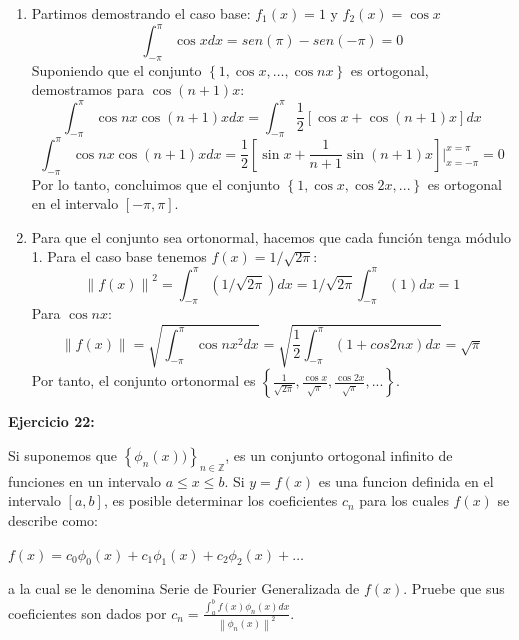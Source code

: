\documentclass[12pt]{article}
\begin{document}
\begin{enumerate}[label=(\alph*)]

    \item Partimos demostrando el caso base: $f_1(x)=1$ y $f_2(x)=\cos{x}$
    \begin{equation}
        \int_{-\pi}^{\pi} \cos{x} dx = sen(\pi)-sen(-\pi)=0
    \end{equation}
    Suponiendo que el conjunto  $\left\lbrace1,\cos{x},\dots,\cos{nx}\right\rbrace$ es ortogonal, demostramos para $\cos{(n+1)x}$:
    \begin{equation}
       \int_{-\pi}^{\pi} \cos{nx}\cos{(n+1)x} dx = \int_{-\pi}^{\pi} \frac{1}{2}\left[ \cos{x}+\cos{(n+1)x} \right] dx
    \end{equation}
    \begin{equation}
       \int_{-\pi}^{\pi} \cos{nx}\cos{(n+1)x} dx  =\frac{1}{2}\left[ \sin{x} + \frac{1}{n+1} \sin{(n+1)x} \right]\bigg\vert_{x=-\pi}^{x=\pi}=0
    \end{equation}
    Por lo tanto, concluimos que el conjunto $\left\lbrace1,\cos{x},\cos{2x},...\right\rbrace$ es ortogonal en el intervalo $[-\pi,\pi]$.

    \item Para que el conjunto sea ortonormal, hacemos que cada función tenga módulo 1. Para el caso base tenemos $f(x)=1/\sqrt{2 \pi }$:
    \begin{equation}
        \left\| f(x) \right\|^2 = \int_{-\pi}^{\pi} (1/\sqrt{2 \pi }) dx = 1/\sqrt{ 2\pi } \int_{-\pi}^{\pi} (1) dx = 1
    \end{equation}
    Para $\cos{nx}$:
    \begin{equation}
        \left\| f(x) \right\| = \sqrt{ \int_{-\pi}^{\pi} \cos{nx}^2 dx } = \sqrt{\frac{1}{2}\int_{-\pi}^{\pi} (1+cos2nx) dx } = \sqrt{\pi}
    \end{equation}
    Por tanto, el conjunto ortonormal es $\left\lbrace\frac{1}{\sqrt{2\pi}},\frac{\cos{x}}{\sqrt{\pi}},\frac{\cos{2x}}{\sqrt{\pi}},...\right\rbrace$.

\end{enumerate}


%
\noindent \textbf{Ejercicio 22:}

Si suponemos que $\left \{ \phi _n(x)) \right \}_{ n \in \mathbb{Z} }$, es un conjunto ortogonal infinito de funciones en un intervalo $a \leq x \leq b$. Si $y=f(x)$ es una funcion definida en el intervalo $[a,b]$, es posible determinar los coeficientes $c_n$ para los cuales $f(x)$ se describe como:
\begin{center}
$f(x) = c_0 \phi_0 (x) + c_1 \phi_1 (x) + c_2 \phi_2 (x) + \dots$
\end{center}
a la cual se le denomina Serie de Fourier Generalizada de $f(x)$. Pruebe que sus coeficientes son dados por $c_n=\frac{\int_{a}^{b} f(x) \phi_n (x)  dx }{ \left \| \phi_n (x) \right \|^2 }$.\\
\end{document}
